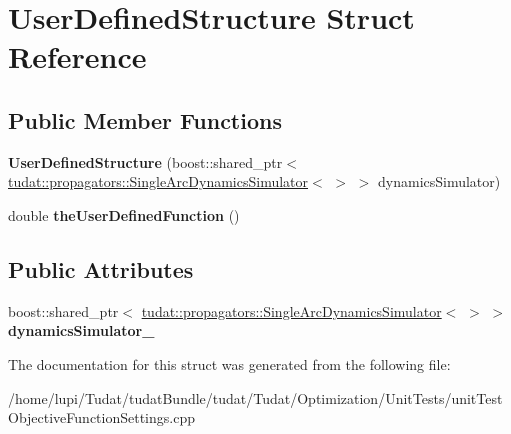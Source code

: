 \hypertarget{structUserDefinedStructure}{}\section{User\+Defined\+Structure Struct Reference}
\label{structUserDefinedStructure}
\subsection*{Public Member Functions}
\begin{DoxyCompactItemize}
\item 
{\bfseries User\+Defined\+Structure} (boost\+::shared\+\_\+ptr$<$ \hyperlink{classtudat_1_1propagators_1_1SingleArcDynamicsSimulator}{tudat\+::propagators\+::\+Single\+Arc\+Dynamics\+Simulator}$<$  $>$ $>$ dynamics\+Simulator)\hypertarget{structUserDefinedStructure_a5ab89cb09d9d0ee52a978ed54cbf4112}{}\label{structUserDefinedStructure_a5ab89cb09d9d0ee52a978ed54cbf4112}

\item 
double {\bfseries the\+User\+Defined\+Function} ()\hypertarget{structUserDefinedStructure_a22462d4ec973e06883f33cce1d3d8c75}{}\label{structUserDefinedStructure_a22462d4ec973e06883f33cce1d3d8c75}

\end{DoxyCompactItemize}
\subsection*{Public Attributes}
\begin{DoxyCompactItemize}
\item 
boost\+::shared\+\_\+ptr$<$ \hyperlink{classtudat_1_1propagators_1_1SingleArcDynamicsSimulator}{tudat\+::propagators\+::\+Single\+Arc\+Dynamics\+Simulator}$<$  $>$ $>$ {\bfseries dynamics\+Simulator\+\_\+}\hypertarget{structUserDefinedStructure_a47771383ec91a0d54e1ad8ce850f9025}{}\label{structUserDefinedStructure_a47771383ec91a0d54e1ad8ce850f9025}

\end{DoxyCompactItemize}


The documentation for this struct was generated from the following file\+:\begin{DoxyCompactItemize}
\item 
/home/lupi/\+Tudat/tudat\+Bundle/tudat/\+Tudat/\+Optimization/\+Unit\+Tests/unit\+Test\+Objective\+Function\+Settings.\+cpp\end{DoxyCompactItemize}
